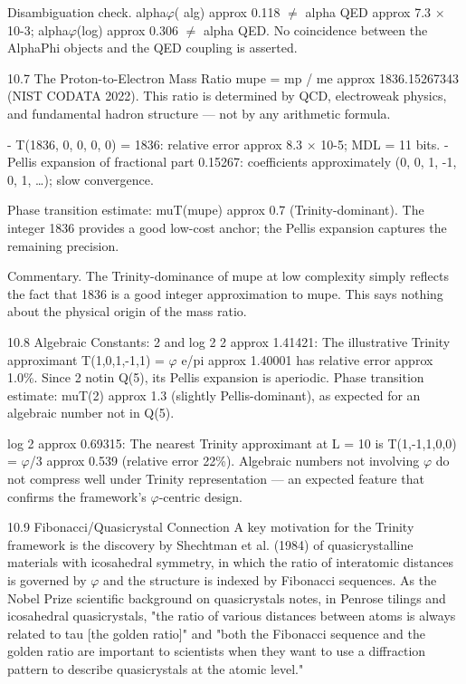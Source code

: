  Disambiguation check. alpha$\varphi$( alg) approx 0.118 $\neq$ alpha QED approx 7.3 $\times$ 10-3;
  alpha$\varphi$(log) approx 0.306 $\neq$ alpha QED. No coincidence between the AlphaPhi objects
  and the QED coupling is asserted.

  10.7 The Proton-to-Electron Mass Ratio
  mupe = mp / me approx 1836.15267343 (NIST CODATA 2022). This ratio is determined
  by QCD, electroweak physics, and fundamental hadron structure --- not by any
  arithmetic formula.

  - T(1836, 0, 0, 0, 0) = 1836: relative error approx 8.3 $\times$ 10-5; MDL = 11 bits.
  - Pellis expansion of fractional part 0.15267: coefficients approximately (0, 0, 1, -1, 0, 1,
  …); slow convergence.

  Phase transition estimate: muT(mupe) approx 0.7 (Trinity-dominant). The integer 1836
  provides a good low-cost anchor; the Pellis expansion captures the remaining precision.

  Commentary. The Trinity-dominance of mupe at low complexity simply reflects the fact
  that 1836 is a good integer approximation to mupe. This says nothing about the
  physical origin of the mass ratio.

  10.8 Algebraic Constants: 2 and log 2
  2 approx 1.41421: The illustrative Trinity approximant T(1,0,1,-1,1) = $\varphi$ e/pi approx
  1.40001 has relative error approx 1.0\%. Since 2 notin Q(5), its Pellis expansion is
  aperiodic. Phase transition estimate: muT(2) approx 1.3 (slightly Pellis-dominant), as
  expected for an algebraic number not in Q(5).

  log 2 approx 0.69315: The nearest Trinity approximant at L = 10 is T(1,-1,1,0,0) = $\varphi$/3
  approx 0.539 (relative error 22\%). Algebraic numbers not involving $\varphi$ do not compress
  well under Trinity representation --- an expected feature that confirms the framework's
  $\varphi$-centric design.

  10.9 Fibonacci/Quasicrystal Connection
  A key motivation for the Trinity framework is the discovery by Shechtman et al. (1984)
  of quasicrystalline materials with icosahedral symmetry, in which the ratio of
  interatomic distances is governed by $\varphi$ and the structure is indexed by Fibonacci
  sequences. As the Nobel Prize scientific background on quasicrystals notes, in Penrose
  tilings and icosahedral quasicrystals, "the ratio of various distances between atoms is
  always related to tau [the golden ratio]" and "both the Fibonacci sequence and the
  golden ratio are important to scientists when they want to use a diffraction pattern to
  describe quasicrystals at the atomic level."

